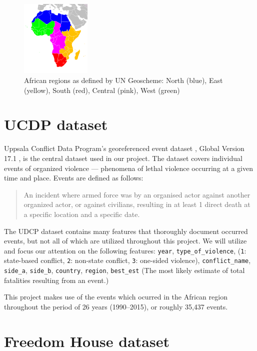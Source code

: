 \documentclass[a4paper,11pt]{article}
\begin{document}
\begin{figure}[ht!]
    \centering
    \includegraphics[width=0.3\textwidth]{images/Africa-regions.png}
    \caption{African regions as defined by UN Geoscheme: North (blue), East (yellow), South (red), Central (pink), West (green)\label{fig:regions}}
\end{figure}

\section{UCDP dataset}

Uppsala Conflict Data Program's georeferenced event dataset \cite{Sundberg:13},
Global Version 17.1 \cite{Codebook2017}, is the central dataset used in our project.
The dataset covers individual events of organized violence --- phenomena of
lethal violence occurring at a given time and place. Events are defined as follows:

\begin{quote}
An incident where armed force was by an organised actor against another
organized actor, or against civilians, resulting in at least 1 direct
death at a specific location and a specific date.
\end{quote}

The UDCP dataset contains many features that thoroughly document occurred
events, but not all of which are utilized throughout this project. We
will utilize and focus our attention on the following features: 
\texttt{year}, \texttt{type\_of\_violence},
(\texttt{1}: state-based conflict, \texttt{2}: non-state conflict, \texttt{3}: one-sided violence),
\texttt{conflict\_name}, \texttt{side\_a}, \texttt{side\_b}, \texttt{country}, \texttt{region},
\texttt{best\_est} (The most likely estimate of total fatalities resulting from an event.)

This project makes use of the events which ocurred in the African region
throughout the period of 26 years (1990--2015), or roughly 35,437 events.

\section{Freedom House dataset}
\end{document}
